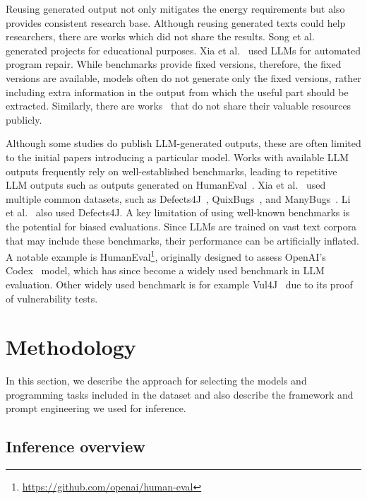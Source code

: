 Reusing generated output not only mitigates the energy requirements but also provides consistent research base.
	Although reusing generated texts could help researchers, there are works which did not share the results.
	Song et al.~\cite{data_no_share_1} generated projects for educational purposes.
	Xia et al.~\cite{data_no_share_2} used LLMs for automated program repair.
	While benchmarks provide fixed versions, therefore, the fixed versions are available, models often do not generate only the fixed versions, rather including extra information in the output from which the useful part should be extracted.
	Similarly, there are works~\cite{data_no_share_3,data_no_share_4,data_no_share_5} that do not share their valuable resources publicly.

Although some studies do publish LLM-generated outputs, these are often limited to the initial papers introducing a particular model.
Works with available LLM outputs frequently rely on well-established benchmarks, leading to repetitive LLM outputs such as outputs generated on HumanEval~\cite{codex}.
Xia et al.~\cite{shared_common_data} used multiple common datasets, such as Defects4J~\cite{defects4j}, QuixBugs~\cite{quix_bugs}, and ManyBugs~\cite{many_bugs}.
Li et al.~\cite{common_shared_llm_output} also used Defects4J.
A key limitation of using well-known benchmarks is the potential for biased evaluations.
Since LLMs are trained on vast text corpora that may include these benchmarks, their performance can be artificially inflated.
A notable example is HumanEval\footnote{\url{https://github.com/openai/human-eval}}, originally designed to assess OpenAI’s Codex~\cite{codex} model, which has since become a widely used benchmark in LLM evaluation.
Other widely used benchmark is for example Vul4J~\cite{vul4j} due to its proof of vulnerability tests.


\section{Methodology}
\label{th4:section:methods}

In this section, we describe the approach for selecting the models and programming tasks included in the dataset and also describe the framework and prompt engineering we used for inference.


\subsection{Inference overview}

